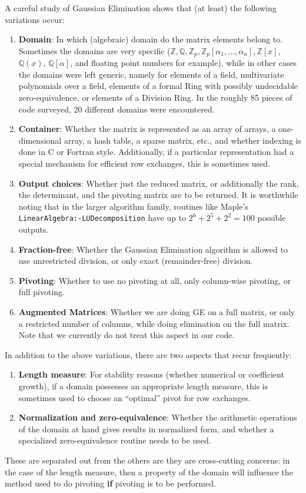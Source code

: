 \documentclass{llncs}
\begin{document}
A careful study of Gaussian Elimination \cite{carette04} shows that
(at least) the following variations occur:
\begin{enumerate}
	\item \textbf{Domain}: In which (algebraic) domain do the matrix
		elements belong to.  Sometimes the domains are very specific
		($\mathbb{Z}, \mathbb{Q}, \mathbb{Z}_p, 
		\mathbb{Z}_p\left[\alpha_1,\ldots,\alpha_n\right], 
		\mathbb{Z}\left[x\right]$, $\mathbb{Q}\left(x\right)$, 
		$\mathbb{Q}\left[\alpha\right]$, and floating point numbers for 
		example), while in other cases the domains were left generic,
		namely for elements of a field,
		multivariate polynomials over a field, elements of a formal Ring
		with possibly undecidable zero-equivalence, or elements of a 
		Division Ring.  In the roughly 85 pieces of code surveyed,
		20 different domains were encountered.
	\item \textbf{Container}: Whether the matrix
		is represented as an array of arrays, a one-dimensional array,
		a hash table, a sparse matrix, etc., and
		whether indexing is done in C or Fortran style.  Additionally,
		if a particular representation had a special mechanism for efficient
		row exchanges, this is sometimes used.  
	\item \textbf{Output choices}:  Whether just the reduced matrix, or
		additionally the rank, the determinant, and the
		pivoting matrix are to be returned.
		It is worthwhile noting that in the larger algorithm family,
		routines like Maple's \texttt{LinearAlgebra:-LUDecomposition} have
		up to $2^6 + 2^5 + 2^2 = 100$ possible outputs.
	\item \textbf{Fraction-free}: Whether the Gaussian Elimination
		algorithm is allowed to use unrestricted division, or only
		exact (remainder-free) division.
	\item \textbf{Pivoting}: Whether to use no pivoting at all, only
		column-wise pivoting, or full pivoting.
	\item \textbf{Augmented Matrices}: Whether we are doing GE on
		a full matrix, or only a restricted number of columns, while
		doing elimination on the full matrix.  Note that we currently
		do not treat this aspect in our code.
\end{enumerate}
\noindent In addition to the above variations, there are two aspects that 
recur frequently:
\begin{enumerate}
	\item \textbf{Length measure}:  For stability reasons
		(whether numerical or coefficient growth), if a domain possesses
		an appropriate length measure, this is sometimes used to choose
		an ``optimal'' pivot for row exchanges.
	\item \textbf{Normalization and zero-equivalence}: Whether the 
		arithmetic operations of the domain at hand gives results in 
		normalized form, and whether a specialized zero-equivalence 
		routine needs to be used.
\end{enumerate}
\noindent These are separated out from the others are they are cross-cutting
concerns: in the case of the length measure, then a property of the domain
will influence the method used to do pivoting \textbf{if} pivoting is to be
performed.
\end{document}
